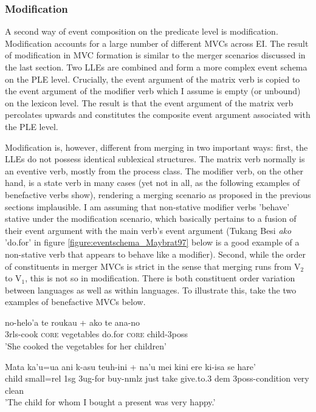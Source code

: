 \subsubsection{Modification}
\label{sec:modification}

A second way of event composition on the predicate level is modification. Modification accounts for a large number of different MVCs across EI. The result of modification in MVC formation is similar to the merger scenarios discussed in the last section. Two LLEs are combined and form a more complex event schema on the PLE level. Crucially, the event argument of the matrix verb is copied to the event argument of the modifier verb which I assume is empty (or unbound) on the lexicon level. The result is that the event argument of the matrix verb percolates upwards and constitutes the composite event argument associated with the PLE level.

Modification is, however, different from merging in two important ways: first, the LLEs do not possess identical sublexical structures. The matrix verb normally is an eventive verb, mostly from the process class. The modifier verb, on the other hand, is a state verb in many cases (yet not in all, as the following examples of benefactive verbs show), rendering a merging scenario as proposed in the previous sections implausible. I am assuming that non-stative modifier verbs 'behave' stative under the modification scenario, which basically pertains to a fusion of their event argument with the main verb's event argument (Tukang Besi \textit{ako} 'do.for' in figure \ref{figure:eventschema_Maybrat97} below is a good example of a non-stative verb that appears to behave like a modifier). Second, while the order of constituents in merger MVCs is strict in the sense that merging runs from V$_2$ to V$_1$, this is not so in modification. There is both constituent order variation between languages as well as within languages. To illustrate this, take the two examples of benefactive MVCs below.

\ea \label{Tukang_3}
\gll no-helo'a te roukau + ako te ana-no \\
3\acs{rls}-cook \textsc{core} vegetables do.for \textsc{core} child-3\acs{poss} \\
\glft 'She cooked the vegetables for her children' \ 
\z
\xe

\ea \label{Makalero_2}
\gll Mata ka’u=ua ani k-asu teuh-ini + na’u mei kini ere ki-isa se hare’ \\
child small=\acs{rel} 1\acs{sg} 3\acs{ug}-for buy-\acs{nmlz} just take give.to.3 \acs{dem} 3\acs{poss}-condition very clean \\
\glft 'The child for whom I bought a present was very happy.' \trailingcitation{{\small (Huber 2011: 105)}}\ 
\z
\xe

